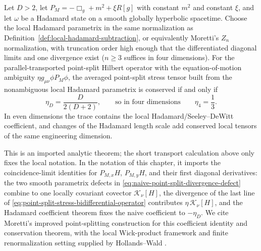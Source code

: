 \begin{quotedtheorem}
\label{prop:parametrix-defect-conservation-repair}
Let \(D>2\), let \(P_M=-\Box_g+m^2+\xi R[g]\) with constant \(m^2\) and
constant \(\xi\), and let \(\omega\) be a Hadamard state on a smooth globally
hyperbolic spacetime.  Choose the local Hadamard parametrix in the same
normalization as Definition~\ref{def:local-hadamard-subtraction}, or
equivalently Moretti's \(Z_n\) normalization, with truncation order high
enough that the differentiated diagonal limits and one divergence exist
(\(n\ge3\) suffices in four dimensions).  For the parallel-transported
point-split Hilbert operator with the equation-of-motion ambiguity
\(\eta g_{\mu\nu}\phi P_M\phi\), the averaged point-split stress tensor built
from the nonambiguous local Hadamard parametrix is conserved if and only if
\[
  \eta_D=\frac{D}{2(D+2)} ,
  \qquad\text{so in four dimensions}\qquad
  \eta_4=\frac13 .
\]
In even dimensions the trace contains the local Hadamard/Seeley--DeWitt
coefficient, and changes of the Hadamard length scale add conserved local
tensors of the same engineering dimension.

This is an imported analytic theorem; the short transport calculation above
only fixes the local notation.  In the notation of this chapter, it imports the
coincidence-limit identities for \(P_{M,x}H\), \(P_{M,y}H\), and their first
diagonal derivatives: the two smooth parametrix defects in
\eqref{eq:naive-point-split-divergence-defect} combine to one locally
covariant covector \(\mathcal K_\nu[H]\), the divergence of the last line of
\eqref{eq:point-split-stress-bidifferential-operator} contributes
\(\eta\,\mathcal K_\nu[H]\), and the Hadamard coefficient theorem fixes the
naive coefficient to \(-\eta_D\).  We cite Moretti's improved point-splitting
construction for this coefficient identity and conservation theorem, with the
local Wick-product framework and finite renormalization setting supplied by
Hollands--Wald
\cite{Moretti2003StressEnergy,HollandsWald2001LocalWick,
HollandsWald2005Conservation,HollandsWald2015QFCS}.
\end{quotedtheorem}

